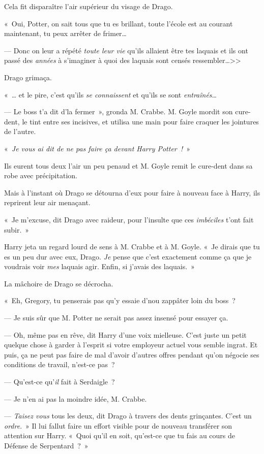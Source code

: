 Cela fit disparaître l'air supérieur du visage de Drago.

«~Oui, Potter, on sait tous que tu es brillant, toute l'école est au courant maintenant, tu peux arrêter de frimer…

--- Donc on leur a répété \emph{toute leur vie} qu'ils allaient être tes laquais et ils ont passé des \emph{années} à s'imaginer à quoi des laquais sont censés ressembler…>>

Drago grimaça.

«~… et le pire, c'est qu'ils \emph{se connaissent} et qu'ils se sont \emph{entraînés}…

--- Le boss t'a dit d'la fermer~», gronda M. Crabbe. M. Goyle mordit son cure-dent, le tint entre ses incisives, et utilisa une main pour faire craquer les jointures de l'autre.

«~\emph{Je vous ai dit de ne pas faire ça devant Harry Potter~!}~»

Ils eurent tous deux l'air un peu penaud et M. Goyle remit le cure-dent dans sa robe avec précipitation.

Mais à l'instant où Drago se détourna d'eux pour faire à nouveau face à Harry, ils reprirent leur air menaçant.

«~Je m'excuse, dit Drago avec raideur, pour l'insulte que ces \emph{imbéciles} t'ont fait subir.~»

Harry jeta un regard lourd de sens à M. Crabbe et à M. Goyle. «~Je dirais que tu es un peu dur avec eux, Drago. \emph{Je} pense que c'est exactement comme ça que je voudrais voir \emph{mes} laquais agir. Enfin, si j'avais des laquais.~»

La mâchoire de Drago se décrocha.

«~Eh, Gregory, tu penserais pas qu'y essaie d'nou zappâter loin du boss~?

--- Je suis sûr que M. Potter ne serait pas assez insensé pour essayer ça.

--- Oh, même pas en rêve, dit Harry d'une voix mielleuse. C'est juste un petit quelque chose à garder à l'esprit si votre employeur actuel vous semble ingrat. Et puis, ça ne peut pas faire de mal d'avoir d'autres offres pendant qu'on négocie ses conditions de travail, n'est-ce pas~?

--- Qu'est-ce qu'\emph{il} fait à Serdaigle~?

--- Je n'en ai pas la moindre idée, M. Crabbe.

--- \emph{Taisez vous} tous les deux, dit Drago à travers des dents grinçantes. C'est un \emph{ordre}.~» Il lui fallut faire un effort visible pour de nouveau transférer son attention sur Harry. «~Quoi qu'il en soit, qu'est-ce que tu fais au cours de Défense de Serpentard~?~»

